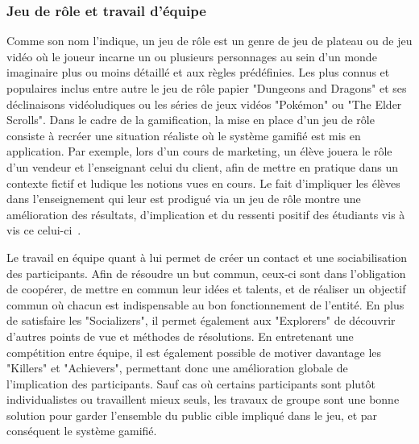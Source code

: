 \subsubsection{Jeu de rôle et travail d'équipe}
Comme son nom l'indique, un jeu de rôle est un genre de jeu de plateau ou de jeu vidéo où le joueur incarne un ou plusieurs personnages au sein d'un monde imaginaire plus ou moins détaillé et aux règles prédéfinies. Les plus connus et populaires inclus entre autre le jeu de rôle papier "Dungeons and Dragons" et ses déclinaisons vidéoludiques ou les séries de jeux vidéos "Pokémon" ou "The Elder Scrolls". Dans le cadre de la gamification, la mise en place d'un jeu de rôle consiste à recréer une situation réaliste où le système gamifié est mis en application. Par exemple, lors d'un cours de marketing, un élève jouera le rôle d'un vendeur et l'enseignant celui du client, afin de mettre en pratique dans un contexte fictif et ludique les notions vues en cours. Le fait d'impliquer les élèves dans l'enseignement qui leur est prodigué via un jeu de rôle montre une amélioration des résultats, d'implication et du ressenti positif des étudiants vis à vis ce celui-ci~\cite{role-playing-educ}. \par

Le travail en équipe quant à lui permet de créer un contact et une sociabilisation des participants. Afin de résoudre un but commun, ceux-ci sont dans l'obligation de coopérer, de mettre en commun leur idées et talents, et de réaliser un objectif commun où chacun est indispensable au bon fonctionnement de l'entité. En plus de satisfaire les "Socializers", il permet également aux "Explorers" de découvrir d'autres points de vue et méthodes de résolutions. En entretenant une compétition entre équipe, il est également possible de motiver davantage les "Killers" et "Achievers", permettant donc une amélioration globale de l'implication des participants. Sauf cas où certains participants sont plutôt individualistes ou travaillent mieux seuls, les travaux de groupe sont une bonne solution pour garder l'ensemble du public cible impliqué dans le jeu, et par conséquent le système gamifié. \par

